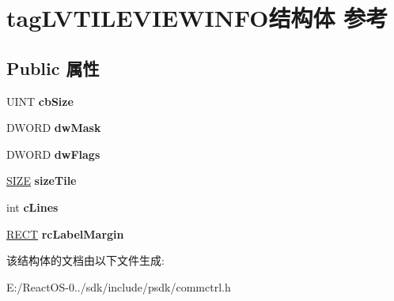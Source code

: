 \hypertarget{structtag_l_v_t_i_l_e_v_i_e_w_i_n_f_o}{}\section{tag\+L\+V\+T\+I\+L\+E\+V\+I\+E\+W\+I\+N\+F\+O结构体 参考}
\label{structtag_l_v_t_i_l_e_v_i_e_w_i_n_f_o}
\subsection*{Public 属性}
\begin{DoxyCompactItemize}
\item 
\mbox{\label{structtag_l_v_t_i_l_e_v_i_e_w_i_n_f_o_ab33b829c8740d585597d3de632303baa}} 
U\+I\+NT {\bfseries cb\+Size}
\item 
\mbox{\label{structtag_l_v_t_i_l_e_v_i_e_w_i_n_f_o_a6c5e117dab37ad86d0a3c66d5422c5f5}} 
D\+W\+O\+RD {\bfseries dw\+Mask}
\item 
\mbox{\label{structtag_l_v_t_i_l_e_v_i_e_w_i_n_f_o_a6725519a0fe647e1084a0f6a7a25d13c}} 
D\+W\+O\+RD {\bfseries dw\+Flags}
\item 
\mbox{\label{structtag_l_v_t_i_l_e_v_i_e_w_i_n_f_o_a2dd9cce74fa3fed26b0c757be8798fea}} 
\hyperlink{structtag_s_i_z_e}{S\+I\+ZE} {\bfseries size\+Tile}
\item 
\mbox{\label{structtag_l_v_t_i_l_e_v_i_e_w_i_n_f_o_a18b3208b2e27300349db767cbe32b692}} 
int {\bfseries c\+Lines}
\item 
\mbox{\label{structtag_l_v_t_i_l_e_v_i_e_w_i_n_f_o_a9f70ce317a520b3ef89077ce9b9c79de}} 
\hyperlink{structtag_r_e_c_t}{R\+E\+CT} {\bfseries rc\+Label\+Margin}
\end{DoxyCompactItemize}


该结构体的文档由以下文件生成\+:\begin{DoxyCompactItemize}
\item 
E\+:/\+React\+O\+S-\/0../sdk/include/psdk/commctrl.\+h\end{DoxyCompactItemize}

